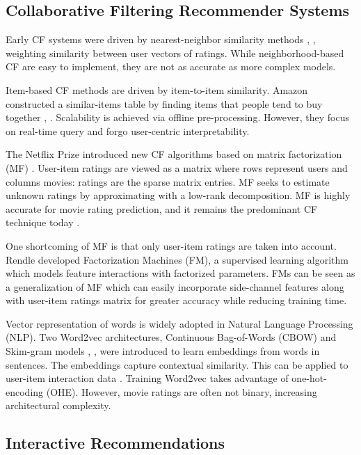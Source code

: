 \subsection{Collaborative Filtering Recommender Systems}

Early CF systems were driven by nearest-neighbor similarity methods \cite{herlocker1999algorithmic}, \cite{smith2017two}, weighting similarity between user vectors of ratings. While neighborhood-based CF are easy to implement, they are not as accurate as more complex models.

Item-based CF methods are driven by item-to-item similarity. Amazon constructed a similar-items table by finding items that people tend to buy together \cite{linden2003amazon}, \cite{smith2017two}. Scalability is achieved via offline pre-processing. However, they focus on real-time query and forgo user-centric interpretability. 

The Netflix Prize introduced new CF algorithms based on matrix factorization (MF) \cite{funk2006netflix}. User-item ratings are viewed as a matrix where rows represent users and columns movies: ratings are the sparse matrix entries. MF seeks to estimate unknown ratings by approximating with a low-rank decomposition. MF is highly accurate for movie rating prediction, and it remains the predominant CF technique today \cite{koren2008factorization}. 

One shortcoming of MF is that only user-item ratings are taken into account. Rendle \cite{rendle2012factorization} developed Factorization Machines (FM), a supervised learning algorithm which models feature interactions with factorized parameters.  FMs can be seen as a generalization of MF which can easily incorporate side-channel features along with user-item ratings matrix for greater accuracy while reducing training time.

Vector representation of words is widely adopted in Natural Language Processing (NLP). Two Word2vec architectures, Continuous Bag-of-Words (CBOW) and Skim-gram models \cite{mikolov2013efficient},  \cite{mikolov2013distributed}, \cite{rong2014word2vec} were introduced to learn embeddings from words in sentences. The embeddings capture contextual similarity. This can be applied to user-item interaction data \cite{ozsoy2016word}. Training Word2vec takes advantage of one-hot-encoding (OHE). However, movie ratings are often not binary, increasing architectural complexity.

\subsection{Interactive Recommendations}


